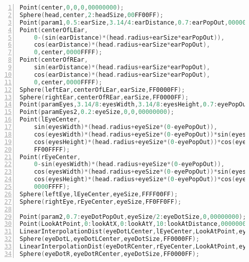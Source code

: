 \begin{lstlisting}[language=C,frame=tb,numbers=left]
Point(center,0,0,0,00000000);
Sphere(head,center,2:headSize,00FF00FF);
Point(param1,0.5:earSize,3.14/4:earDistance,0.7:earPopOut,00000000);
Point(centerOfLEar,
	0-(sin(earDistance)*(head.radius+earSize*earPopOut)),
	cos(earDistance)*(head.radius+earSize*earPopOut),
	0,center,0000FFFF);
Point(centerOfREar,
	sin(earDistance)*(head.radius+earSize*earPopOut),
	cos(earDistance)*(head.radius+earSize*earPopOut),
	0,center,0000FFFF);
Sphere(leftEar,centerOfLEar,earSize,FF0000FF);
Sphere(rightEar,centerOfREar,earSize,FF0000FF);
Point(paramEyes,3.14/8:eyesWidth,3.14/8:eyesHeight,0.7:eyePopOut,00000000);
Point(paramEyes2,0.2:eyeSize,0,0,00000000);
Point(lEyeCenter,
	sin(eyesWidth)*(head.radius+eyeSize*(0-eyePopOut)),
	cos(eyesWidth)*(head.radius+eyeSize*(0-eyePopOut))*sin(eyesHeight),
	cos(eyesHeight)*(head.radius+eyeSize*(0-eyePopOut))*cos(eyesWidth),
	FF00FFFF);
Point(rEyeCenter,
	0-sin(eyesWidth)*(head.radius+eyeSize*(0-eyePopOut)),
	cos(eyesWidth)*(head.radius+eyeSize*(0-eyePopOut))*sin(eyesHeight),
	cos(eyesHeight)*(head.radius+eyeSize*(0-eyePopOut))*cos(eyesWidth),
	0000FFFF);
Sphere(leftEye,lEyeCenter,eyeSize,FFFF00FF);
Sphere(rightEye,rEyeCenter,eyeSize,FF0FF0FF);

Point(param2,0.7:eyeDotPopOut,eyeSize/2:eyeDotSize,0,00000000);
Point(LookAtPoint,0:lookAtX,0:lookAtY,10:lookAtDistance,00000000);
LinearInterpolationDist(eyeDotLCenter,lEyeCenter,LookAtPoint,eyeSize-eyeDotSize*eyeDotPopOut,00000000);
Sphere(eyeDotL,eyeDotLCenter,eyeDotSize,FF0000FF);
LinearInterpolationDist(eyeDotRCenter,rEyeCenter,LookAtPoint,eyeSize-eyeDotSize*eyeDotPopOut,00000000);
Sphere(eyeDotR,eyeDotRCenter,eyeDotSize,FF0000FF);
\end{lstlisting}{}




